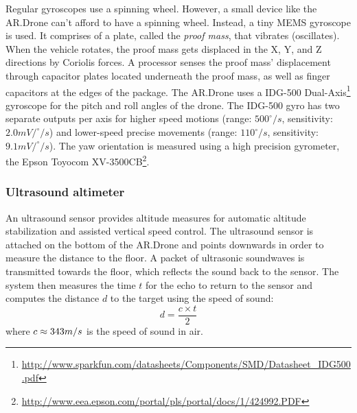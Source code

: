 Regular gyroscopes use a spinning wheel.
However, a small device like the AR.Drone can't afford to have a spinning wheel.
Instead, a tiny MEMS gyroscope is used. 
It comprises of a plate, called the \textit{proof mass}, that vibrates (oscillates).
When the vehicle rotates, the proof mass gets displaced in the X, Y, and Z directions by Coriolis forces.
A processor senses the proof mass’ displacement through capacitor plates located underneath the proof mass, as well as finger capacitors at the edges of the package.
The AR.Drone uses a IDG-500 Dual-Axis\footnote{\url{http://www.sparkfun.com/datasheets/Components/SMD/Datasheet_IDG500.pdf}} gyroscope for the pitch and roll angles of the drone.
The IDG-500 gyro has two separate outputs per axis for higher speed motions (range: $500^{\circ}/s$, sensitivity: $2.0mV/^{\circ}/s$) and lower-speed precise movements (range: $110^{\circ}/s$, sensitivity: $9.1mV/^{\circ}/s$).
The yaw orientation is measured using a high precision gyrometer, the Epson Toyocom XV-3500CB\footnote{\url{http://www.eea.epson.com/portal/pls/portal/docs/1/424992.PDF}}.


\subsubsection{Ultrasound altimeter}
\label{sec:ultrasound_altimeter}
An ultrasound sensor provides altitude measures for automatic altitude stabilization and assisted vertical speed control.
The ultrasound sensor is attached on the bottom of the AR.Drone and points downwards in order to measure the distance to the floor.
A packet of ultrasonic soundwaves is transmitted towards the floor, which reflects the sound back to the sensor.
The system then measures the time $t$ for the echo to return to the sensor and computes the distance $d$ to the target using the speed of sound:
\begin{equation}
d = \frac{c \times t}{2}
\end{equation}
where $c \approx 343\small{m/s}$ is the speed of sound in air.

